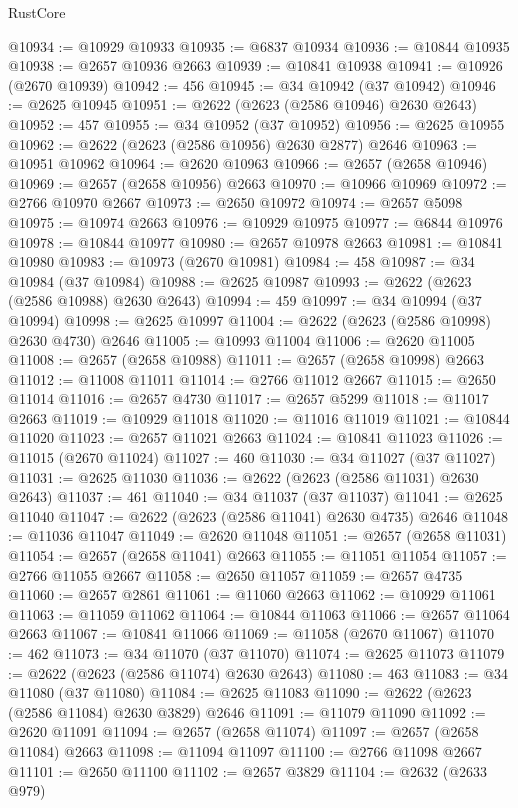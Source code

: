 \begin{lexlean}{RustCore}
\begin{coremodule}
@10934 := @10929 @10933
@10935 := @6837 @10934
@10936 := @10844 @10935
@10938 := @2657 @10936 @2663
@10939 := @10841 @10938
@10941 := @10926 (@2670 @10939)
@10942 := 456
@10945 := @34 @10942 (@37 @10942)
@10946 := @2625 @10945
@10951 := @2622 (@2623 (@2586 @10946) @2630 @2643)
@10952 := 457
@10955 := @34 @10952 (@37 @10952)
@10956 := @2625 @10955
@10962 := @2622 (@2623 (@2586 @10956) @2630 @2877) @2646
@10963 := @10951 @10962
@10964 := @2620 @10963
@10966 := @2657 (@2658 @10946)
@10969 := @2657 (@2658 @10956) @2663
@10970 := @10966 @10969
@10972 := @2766 @10970 @2667
@10973 := @2650 @10972
@10974 := @2657 @5098
@10975 := @10974 @2663
@10976 := @10929 @10975
@10977 := @6844 @10976
@10978 := @10844 @10977
@10980 := @2657 @10978 @2663
@10981 := @10841 @10980
@10983 := @10973 (@2670 @10981)
@10984 := 458
@10987 := @34 @10984 (@37 @10984)
@10988 := @2625 @10987
@10993 := @2622 (@2623 (@2586 @10988) @2630 @2643)
@10994 := 459
@10997 := @34 @10994 (@37 @10994)
@10998 := @2625 @10997
@11004 := @2622 (@2623 (@2586 @10998) @2630 @4730) @2646
@11005 := @10993 @11004
@11006 := @2620 @11005
@11008 := @2657 (@2658 @10988)
@11011 := @2657 (@2658 @10998) @2663
@11012 := @11008 @11011
@11014 := @2766 @11012 @2667
@11015 := @2650 @11014
@11016 := @2657 @4730
@11017 := @2657 @5299
@11018 := @11017 @2663
@11019 := @10929 @11018
@11020 := @11016 @11019
@11021 := @10844 @11020
@11023 := @2657 @11021 @2663
@11024 := @10841 @11023
@11026 := @11015 (@2670 @11024)
@11027 := 460
@11030 := @34 @11027 (@37 @11027)
@11031 := @2625 @11030
@11036 := @2622 (@2623 (@2586 @11031) @2630 @2643)
@11037 := 461
@11040 := @34 @11037 (@37 @11037)
@11041 := @2625 @11040
@11047 := @2622 (@2623 (@2586 @11041) @2630 @4735) @2646
@11048 := @11036 @11047
@11049 := @2620 @11048
@11051 := @2657 (@2658 @11031)
@11054 := @2657 (@2658 @11041) @2663
@11055 := @11051 @11054
@11057 := @2766 @11055 @2667
@11058 := @2650 @11057
@11059 := @2657 @4735
@11060 := @2657 @2861
@11061 := @11060 @2663
@11062 := @10929 @11061
@11063 := @11059 @11062
@11064 := @10844 @11063
@11066 := @2657 @11064 @2663
@11067 := @10841 @11066
@11069 := @11058 (@2670 @11067)
@11070 := 462
@11073 := @34 @11070 (@37 @11070)
@11074 := @2625 @11073
@11079 := @2622 (@2623 (@2586 @11074) @2630 @2643)
@11080 := 463
@11083 := @34 @11080 (@37 @11080)
@11084 := @2625 @11083
@11090 := @2622 (@2623 (@2586 @11084) @2630 @3829) @2646
@11091 := @11079 @11090
@11092 := @2620 @11091
@11094 := @2657 (@2658 @11074)
@11097 := @2657 (@2658 @11084) @2663
@11098 := @11094 @11097
@11100 := @2766 @11098 @2667
@11101 := @2650 @11100
@11102 := @2657 @3829
@11104 := @2632 (@2633 @979)

\end{coremodule}
\end{lexlean}
